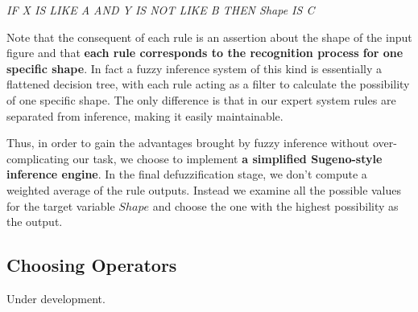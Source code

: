 \textit{IF X IS LIKE A AND Y IS NOT LIKE B THEN Shape IS C}

Note that the consequent of each rule is an assertion about the shape of the input figure and that \textbf{each rule corresponds to the recognition process for one specific shape}. In fact a fuzzy inference system of this kind is essentially a flattened decision tree, with each rule acting as a filter to calculate the possibility of one specific shape. The only difference is that in our expert system rules are separated from inference, making it easily maintainable.

Thus, in order to gain the advantages brought by fuzzy inference without over-complicating our task, we choose to implement \textbf{a simplified Sugeno-style inference engine}. In the final defuzzification stage, we don't compute a weighted average of the rule outputs. Instead we examine all the possible values for the target variable $Shape$ and choose the one with the highest possibility as the output.

\subsection{Choosing Operators}

Under development.